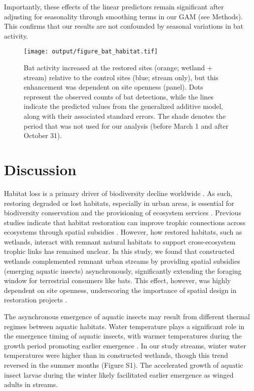 \documentclass[11pt, class=article, crop=false]{standalone}
\begin{document}


Importantly, these effects of the linear predictors remain significant after adjusting for seasonality through smoothing terms in our GAM (see Methods).
This confirms that our results are not confounded by seasonal variations in bat activity.

\begin{figure}
    \centering
    \texttt{[image: output/figure\_bat\_habitat.tif]}
    \caption{Bat activity increased at the restored sites (orange; wetland + stream) relative to the control sites (blue; stream only), but this enhancement was dependent on site openness (panel). Dots represent the observed counts of bat detections, while the lines indicate the predicted values from the generalized additive model, along with their associated standard errors. The shade denotes the period that was not used for our analysis (before March 1 and after October 31).}
    \label{fig:bat-activity}
\end{figure}

\newpage

\section{Discussion}

Habitat loss is a primary driver of biodiversity decline worldwide \citep{chase_ecosystem_2020, fluet-chouinard_extensive_2023}.
As such, restoring degraded or lost habitats, especially in urban areas, is essential for biodiversity conservation and the provisioning of ecosystem services \citep{elmqvist_benefits_2015, palmer_ecological_2014}.
Previous studies indicate that habitat restoration can improve trophic connections across ecosystems through spatial subsidies \citep{buckner_conserving_2018, kupilas_stable_2020}.
However, how restored habitats, such as wetlands, interact with remnant natural habitats to support cross-ecosystem trophic links has remained unclear.
In this study, we found that constructed wetlands complemented remnant urban streams by providing spatial subsidies (emerging aquatic insects) asynchronously, significantly extending the foraging window for terrestrial consumers like bats.
This effect, however, was highly dependent on site openness, underscoring the importance of spatial design in restoration projects \citep{olds_synergistic_2012, gilby_spatial_2018, wahl_approximation_2024}.

The asynchronous emergence of aquatic insects may result from different thermal regimes between aquatic habitats.
Water temperature plays a significant role in the emergence timing of aquatic insects, with warmer temperatures during the growth period promoting earlier emergence \citep{woods_phenology_2022}.
In our study streams, winter water temperatures were higher than in constructed wetlands, though this trend reversed in the summer months (Figure S1).
The accelerated growth of aquatic insect larvae during the winter likely facilitated earlier emergence as winged adults in streams.
\end{document}
